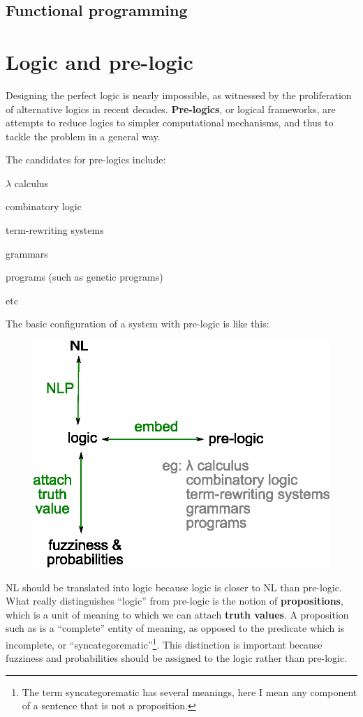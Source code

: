 \subsection{Functional programming}

\section{Logic and pre-logic}

Designing the perfect logic is nearly impossible, as witnessed by the proliferation of alternative logics in recent decades.  \textbf{Pre-logics}, or logical frameworks, are attempts to reduce logics to simpler computational mechanisms, and thus to tackle the problem in a general way.

The candidates for pre-logics include:
\begin{compactenum}[\textbullet ]
\item $\lambda$ calculus
\item combinatory logic
\item term-rewriting systems
\item grammars
\item programs (such as genetic programs)
\item etc
\end{compactenum}

The basic configuration of a system with pre-logic is like this:
\begin{figure}[H]
\centering
\includegraphics[scale=0.7]{prelogic.eps}
\end{figure}
NL should be translated into logic because logic is closer to NL than pre-logic.  What really distinguishes ``logic'' from pre-logic is the notion of \textbf{propositions}, which is a unit of meaning to which we can attach \textbf{truth values}.  A proposition such as  is a ``complete'' entity of meaning, as opposed to the predicate  which is incomplete, or ``syncategorematic''\footnote{The term syncategorematic has several meanings, here I mean any component of a sentence that is not a proposition.}.  This distinction is important because fuzziness and probabilities should be assigned to the logic rather than pre-logic.

